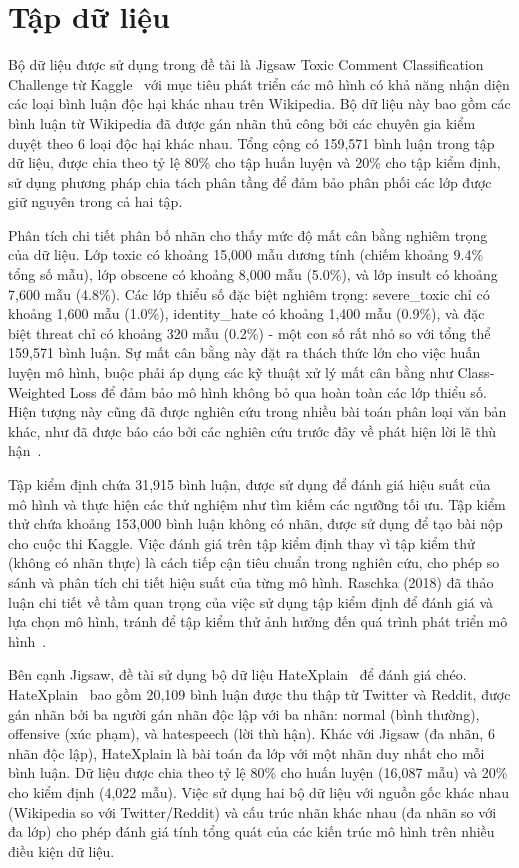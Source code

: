 \documentclass[../BTL.tex]{subfiles}
\begin{document}
\section{Tập dữ liệu}
Bộ dữ liệu được sử dụng trong đề tài là Jigsaw Toxic Comment Classification Challenge từ Kaggle~\cite{kaggleJigsaw} với mục tiêu phát triển các mô hình có khả năng nhận diện các loại bình luận độc hại khác nhau trên Wikipedia. Bộ dữ liệu này bao gồm các bình luận từ Wikipedia đã được gán nhãn thủ công bởi các chuyên gia kiểm duyệt theo 6 loại độc hại khác nhau. Tổng cộng có 159,571 bình luận trong tập dữ liệu, được chia theo tỷ lệ 80\% cho tập huấn luyện và 20\% cho tập kiểm định, sử dụng phương pháp chia tách phân tầng để đảm bảo phân phối các lớp được giữ nguyên trong cả hai tập.

Phân tích chi tiết phân bố nhãn cho thấy mức độ mất cân bằng nghiêm trọng của dữ liệu. Lớp toxic có khoảng 15,000 mẫu dương tính (chiếm khoảng 9.4\% tổng số mẫu), lớp obscene có khoảng 8,000 mẫu (5.0\%), và lớp insult có khoảng 7,600 mẫu (4.8\%). Các lớp thiểu số đặc biệt nghiêm trọng: severe\_toxic chỉ có khoảng 1,600 mẫu (1.0\%), identity\_hate có khoảng 1,400 mẫu (0.9\%), và đặc biệt threat chỉ có khoảng 320 mẫu (0.2\%) - một con số rất nhỏ so với tổng thể 159,571 bình luận. Sự mất cân bằng này đặt ra thách thức lớn cho việc huấn luyện mô hình, buộc phải áp dụng các kỹ thuật xử lý mất cân bằng như Class-Weighted Loss để đảm bảo mô hình không bỏ qua hoàn toàn các lớp thiểu số. Hiện tượng này cũng đã được nghiên cứu trong nhiều bài toán phân loại văn bản khác, như đã được báo cáo bởi các nghiên cứu trước đây về phát hiện lời lẽ thù hận~\cite{djuric2015hate}.

Tập kiểm định chứa 31,915 bình luận, được sử dụng để đánh giá hiệu suất của mô hình và thực hiện các thử nghiệm như tìm kiếm các ngưỡng tối ưu. Tập kiểm thử chứa khoảng 153,000 bình luận không có nhãn, được sử dụng để tạo bài nộp cho cuộc thi Kaggle. Việc đánh giá trên tập kiểm định thay vì tập kiểm thử (không có nhãn thực) là cách tiếp cận tiêu chuẩn trong nghiên cứu, cho phép so sánh và phân tích chi tiết hiệu suất của từng mô hình. Raschka (2018) đã thảo luận chi tiết về tầm quan trọng của việc sử dụng tập kiểm định để đánh giá và lựa chọn mô hình, tránh để tập kiểm thử ảnh hưởng đến quá trình phát triển mô hình~\cite{raschka2018roc}.

Bên cạnh Jigsaw, đề tài sử dụng bộ dữ liệu HateXplain~\cite{hatexplain2021} để đánh giá chéo. HateXplain~\cite{hatexplain2021} bao gồm 20,109 bình luận được thu thập từ Twitter và Reddit, được gán nhãn bởi ba người gán nhãn độc lập với ba nhãn: normal (bình thường), offensive (xúc phạm), và hatespeech (lời thù hận). Khác với Jigsaw (đa nhãn, 6 nhãn độc lập), HateXplain là bài toán đa lớp với một nhãn duy nhất cho mỗi bình luận. Dữ liệu được chia theo tỷ lệ 80\% cho huấn luyện (16,087 mẫu) và 20\% cho kiểm định (4,022 mẫu). Việc sử dụng hai bộ dữ liệu với nguồn gốc khác nhau (Wikipedia so với Twitter/Reddit) và cấu trúc nhãn khác nhau (đa nhãn so với đa lớp) cho phép đánh giá tính tổng quát của các kiến trúc mô hình trên nhiều điều kiện dữ liệu.
\end{document}
